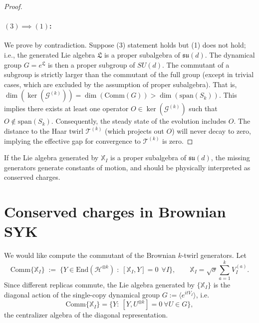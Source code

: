 \documentclass{article}
\theoremstyle{definition}
\begin{document}
\begin{proof}
        \paragraph{$(3) \implies (1)$:}
        We prove by contradiction. Suppose (3) statement holds but (1) does not
        hold; i.e., the generated Lie algebra $\mathfrak{L}$ is a proper subalgebra
        of $\mathfrak{su}(d)$. The dynamical group $G = e^{\mathfrak{L}}$ is
        then a proper subgroup of $SU(d)$. The commutant of a subgroup is strictly
        larger than the commutant of the full group (except in trivial cases, which
        are excluded by the assumption of proper subalgebra). That is,
        $\dim(\ker(\mathcal{G}^{(k)})) = \dim(\text{Comm}(G)) > \dim(\text{span}(
        S_{k}))$. This implies there exists at least one operator $O \in \ker(\mathcal{G}
        ^{(k)})$ such that $O \notin \text{span}(S_{k})$. Consequently, the steady
        state of the evolution includes $O$. The distance to the Haar twirl
        $\mathcal{T}^{(k)}$ (which projects out $O$) will never decay to zero, implying
        the effective gap for convergence to $\mathcal{T}^{(k)}$ is zero.
    \end{proof}
    If the Lie algebra generated by $\mathbb{X}_{I}$ is a proper subalgebra of $\mathfrak{su}
    (d)$, the missing generators generate constants of motion, and should be physically
    interpreted as conserved charges.

    \section{Conserved charges in Brownian SYK}

    We would like compute the commutant of the Brownian $k$-twirl generators. Let
    \[
        \mathrm{Comm}\{\mathbb{X}_{I}\}\;:=\;\Big\{Y\in\mathrm{End}(\mathcal{H}^{\otimes
        k})\;:\;[\mathbb{X}_{I},Y]=0\ \ \forall I\Big\}, \qquad \mathbb{X}_{I}=\sqrt{\sigma}
        \sum_{a=1}^{k}V_{I}^{(a)}.
    \]
    Since different replicas commute, the Lie algebra generated by
    $\{\mathbb{X}_{I}\}$ is the diagonal action of the single-copy dynamical
    group $G:=\langle e^{itV_I}\rangle$, i.e.
    \[
        \mathrm{Comm}\{\mathbb{X}_{I}\}=\{Y:\ [Y,U^{\otimes k}]=0\ \forall U\in G
        \},
    \]
    the centralizer algebra of the diagonal representation.
\end{document}
